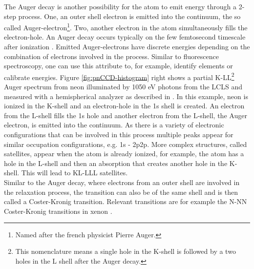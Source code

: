 %
The Auger decay is another possibility for the atom to emit energy through a 2-step process. One, an outer shell electron is emitted into the continuum, the so called Auger-electron\footnote{Named after the french physicist Pierre Auger.}. Two, another electron in the atom simultaneously fills the electron-hole. An Auger decay occurs typically on the few femtosecond timescale after ionization \citep{Krause-1970-PhysLettA}. Emitted Auger-electrons have discrete energies depending on the combination of electrons involved in the process. Similar to fluorescence spectroscopy, one can use this attribute to, for example, identify elements or calibrate energies. Figure \ref{fig:pnCCD-histogram} right shows a partial K-LL\footnote{This nomenclature means a single hole in the K-shell is followed by a two holes in the L shell after the Auger decay.} Auger spectrum from neon illuminated by 1050 eV photons from the LCLS and measured with a hemispherical analyzer as described in \citep{Bucher-2014-Unpublished}. In this example, neon is ionized in the K-shell and an electron-hole in the 1s shell is created. An electron from the L-shell fills the 1s hole and another electron from the L-shell, the Auger electron, is emitted into the continuum. As there is a variety of electronic configurations that can be involved in this process multiple peaks appear for similar occupation configurations, e.g. 1s - 2p2p. More complex structures, called satellites, appear when the atom is already ionized, for example, the atom has a hole in the L-shell and then an absorption that creates another hole in the K-shell. This will lead to KL-LLL satellites.\\
Similar to the Auger decay, where electrons from an outer shell are involved in the relaxation process, the transition can also be of the same shell and is then called a Coster-Kronig transition. Relevant transitions are for example the N-NN Coster-Kronig transitions in xenon \citep{Coster-1935-Physica}.
%
%
%
%
